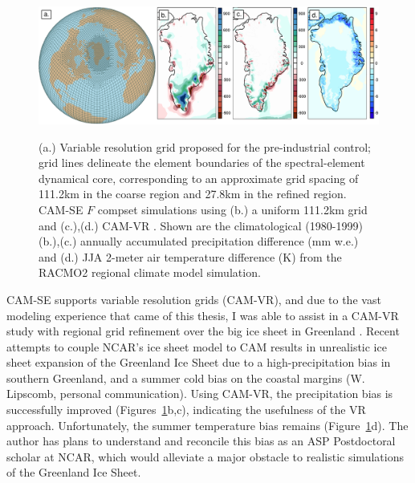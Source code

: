 \begin{figure}[t]
\begin{center}
\noindent\includegraphics[width=35pc,angle=0]{chapter7/asp_panel.png}\\
\end{center}
\caption{(a.) Variable resolution grid proposed for the pre-industrial control; grid lines delineate the element boundaries of the spectral-element dynamical core, corresponding to an approximate grid spacing of 111.2km in the coarse region and 27.8km in the refined region. CAM-SE $F$ compset simulations using (b.) a uniform 111.2km grid and (c.),(d.) CAM-VR \citep{VETAL2018TC}. Shown are the climatological (1980-1999) (b.),(c.) annually accumulated precipitation difference (mm w.e.) and (d.) JJA 2-meter air temperature difference (K) from the RACMO2 regional climate model simulation.}
\label{fig:se-mesh}
\end{figure}

CAM-SE supports variable resolution grids (CAM-VR), and due to the vast modeling experience that came of this thesis, I was able to assist in a CAM-VR study with regional grid refinement over the big ice sheet in Greenland \citep[Figure~\ref{fig:se-mesh}a;][]{VETAL2018TC}. Recent attempts to couple NCAR's ice sheet model to CAM results in unrealistic ice sheet expansion of the Greenland Ice Sheet due to a high-precipitation bias in southern Greenland, and a summer cold bias on the coastal margins (W. Lipscomb, personal communication). Using CAM-VR, the precipitation bias is successfully improved (Figures~\ref{fig:se-mesh}b,c), indicating the usefulness of the VR approach. Unfortunately, the summer temperature bias remains (Figure~\ref{fig:se-mesh}d). The author has plans to understand and reconcile this bias as an ASP Postdoctoral scholar at NCAR, which would alleviate a major obstacle to realistic simulations of the Greenland Ice Sheet.